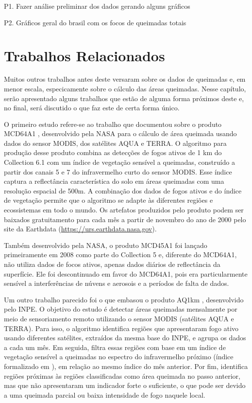 \documentclass[cic,tc]{iiufrgs}
\begin{document}
P1. Fazer análise preliminar dos dados gerando alguns gráficos \par
P2. Gráficos geral do brasil com os focos de queimadas totais \cite{geographicDataSciencePython} \par



\chapter{Trabalhos Relacionados}
\label{chp:trabalhos_relacionados}

Muitos outros trabalhos antes deste versaram sobre os dados de queimadas e, em menor escala, especicamente sobre o cálculo das áreas queimadas. Nesse capítulo, serão apresentado alguns trabalhos que estão de alguma forma próximos deste e, no final, será discutido o que faz este de certa forma único. \par

O primeiro estudo refere-se ao trabalho que documentou sobre o produto MCD64A1 \citep{GIGLIO201872}, desenvolvido pela NASA para o cálculo de área queimada usando dados do sensor MODIS, dos satélites AQUA e TERRA. O algoritmo para produção desse produto combina as detecções de fogos ativos de 1 km do Collection 6.1 com um índice de vegetação sensível a queimadas, construído a partir dos canais 5 e 7 do infravermelho curto do sensor MODIS. Esse índice captura a reflectância característica do solo em áreas queimadas com uma resolução espacial de 500m. A combinação dos dados de fogos ativos e do índice de vegetação permite que o algoritmo se adapte às diferentes regiões e ecossistemas em todo o mundo. Os artefatos produzidos pelo produto podem ser baixados gratuitamento para cada mês a partir de novembro do ano de 2000 pelo site da Earthdata (\url{https://urs.earthdata.nasa.gov}).

Também desenvolvido pela NASA, o produto MCD45A1 foi lançado primeiramente em 2008 como parte do Collection 5 e, diferente do MCD64A1, não utiliza dados de focos ativos, apenas dados diários de reflectância da superfície. Ele foi descontinuado em favor do MCD64A1, pois era particularmente sensível a interferências de núvens e aerosois e a períodos de falta de dados. 

Um outro trabalho parecido foi o que embasou o produto AQ1km \citep{libonati2015algorithm}, desenvolvido pelo INPE. O objetivo do estudo é detectar áreas queimadas mensalmente por meio de sensoriamento remoto utilizando o sensor MODIS (satélites AQUA e TERRA). Para isso, o algoritmo identifica regiões que apresentaram fogo ativo usando diferentes satélites, extraídos da mesma base do INPE, e agrupa os dados a cada um mês. Em seguida, filtra essas regiões com base em um índice de vegetação sensível a queimadas no espectro do infravermelho próximo (índice formalizado em \citet{libonati2011}), em relação ao mesmo índice do mês anterior. Por fim, identifica regiões próximas às regiões classificadas como área queimada no passo anterior, mas que não apresentaram um indicador forte o suficiente, o que pode ser devido a uma queimada parcial ou baixa intensidade de fogo naquele local. \par
\end{document}
